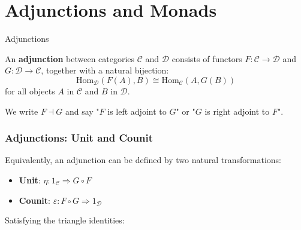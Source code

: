\documentclass{beamer}
\begin{document}
\section{Adjunctions and Monads}

\begin{frame}{Adjunctions}
    \begin{definition}
        An \textbf{adjunction} between categories $\mathcal{C}$ and $\mathcal{D}$ consists of functors $F: \mathcal{C} \to \mathcal{D}$ and $G: \mathcal{D} \to \mathcal{C}$, together with a natural bijection:
        \[\text{Hom}_{\mathcal{D}}(F(A), B) \cong \text{Hom}_{\mathcal{C}}(A, G(B))\]
        for all objects $A$ in $\mathcal{C}$ and $B$ in $\mathcal{D}$.
        
        We write $F \dashv G$ and say "$F$ is left adjoint to $G$" or "$G$ is right adjoint to $F$".
    \end{definition}
\end{frame}

\begin{frame}[fragile]
\frametitle{Adjunctions: Unit and Counit}
    Equivalently, an adjunction can be defined by two natural transformations:
    \begin{itemize}
        \item \textbf{Unit}: $\eta: 1_{\mathcal{C}} \Rightarrow G \circ F$
        \item \textbf{Counit}: $\varepsilon: F \circ G \Rightarrow 1_{\mathcal{D}}$
    \end{itemize}
    
    Satisfying the triangle identities:
    \begin{columns}
        \begin{column}{0.5\textwidth}
        \end{column}
        \begin{column}{0.5\textwidth}
        \end{column}
    \end{columns}
\end{frame}
\end{document}
